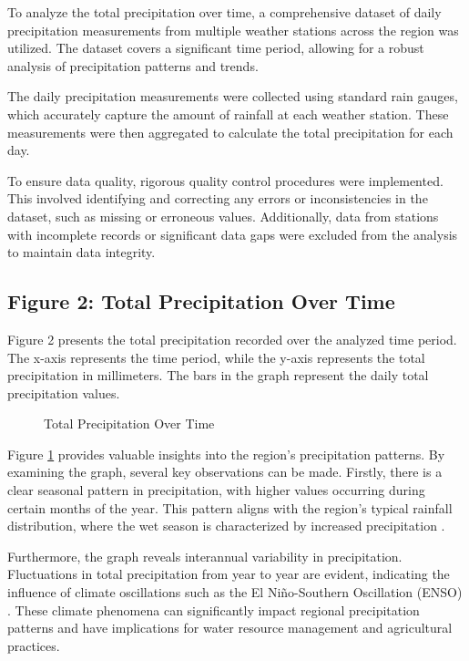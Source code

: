 \documentclass{article}
\begin{document}
To analyze the total precipitation over time, a comprehensive dataset of daily precipitation measurements from multiple weather stations across the region was utilized. The dataset covers a significant time period, allowing for a robust analysis of precipitation patterns and trends.

The daily precipitation measurements were collected using standard rain gauges, which accurately capture the amount of rainfall at each weather station. These measurements were then aggregated to calculate the total precipitation for each day.

To ensure data quality, rigorous quality control procedures were implemented. This involved identifying and correcting any errors or inconsistencies in the dataset, such as missing or erroneous values. Additionally, data from stations with incomplete records or significant data gaps were excluded from the analysis to maintain data integrity.

\subsection{Figure 2: Total Precipitation Over Time}

Figure 2 presents the total precipitation recorded over the analyzed time period. The x-axis represents the time period, while the y-axis represents the total precipitation in millimeters. The bars in the graph represent the daily total precipitation values.

\begin{figure}[h]
  \centering
  \caption{Total Precipitation Over Time}
  \label{fig:precip_over_time}
\end{figure}

Figure \ref{fig:precip_over_time} provides valuable insights into the region's precipitation patterns. By examining the graph, several key observations can be made. Firstly, there is a clear seasonal pattern in precipitation, with higher values occurring during certain months of the year. This pattern aligns with the region's typical rainfall distribution, where the wet season is characterized by increased precipitation \cite{reference4}.

Furthermore, the graph reveals interannual variability in precipitation. Fluctuations in total precipitation from year to year are evident, indicating the influence of climate oscillations such as the El Niño-Southern Oscillation (ENSO) \cite{reference5}. These climate phenomena can significantly impact regional precipitation patterns and have implications for water resource management and agricultural practices.
\end{document}
